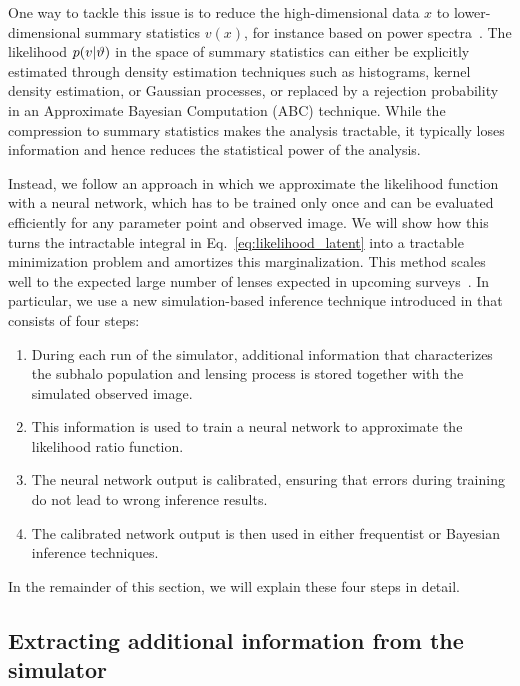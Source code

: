 \documentclass[twocolumn]{aastex62}
\begin{document}
One way to tackle this issue is to reduce the high-dimensional data $x$ to lower-dimensional summary statistics $v(x)$, for instance based on power spectra~\citep{1403.2720,1809.00004,1707.04590,1806.07897,1808.03501,1710.03075,1506.01724}. The likelihood $p(v|\vartheta)$ in the space of summary statistics can either be explicitly estimated through density estimation techniques such as histograms, kernel density estimation, or Gaussian processes, or replaced by a rejection probability in an Approximate Bayesian Computation (ABC) technique. While the compression to summary statistics makes the analysis tractable, it typically loses information and hence reduces the statistical power of the analysis.

Instead, we follow an approach in which we approximate the likelihood function with a neural network, which has to be trained only once and can be evaluated efficiently for any parameter point and observed image. We will show how this turns the intractable integral in Eq.~\eqref{eq:likelihood_latent} into a tractable minimization problem and amortizes this marginalization. This method scales well to the expected large number of lenses expected in upcoming surveys~\citep{2015ApJ...811...20C,1001.2037,1003.5567}. In particular, we use a new simulation-based inference technique introduced in \cite{1805.00013,1805.00020,1805.12244} that consists of four steps:
%
\begin{enumerate}
  \item During each run of the simulator, additional information that characterizes the subhalo population and lensing process is stored together with the simulated observed image.
  \item This information is used to train a neural network to approximate the likelihood ratio function.
  \item The neural network output is calibrated, ensuring that errors during training do not lead to wrong inference results.
  \item The calibrated network output is then used in either frequentist or Bayesian inference techniques.
\end{enumerate}
%
In the remainder of this section, we will explain these four steps in detail.


\subsection{Extracting additional information from the simulator}
\label{sec:lfi-gold}
\end{document}
